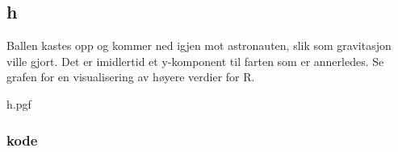 \subsection{h}

Ballen kastes opp og kommer ned igjen mot astronauten, slik som gravitasjon ville gjort. Det er imidlertid et y-komponent til farten som er annerledes. Se grafen for en visualisering av høyere verdier for R.

{h.pgf}

\newpage

\subsubsection{kode}


